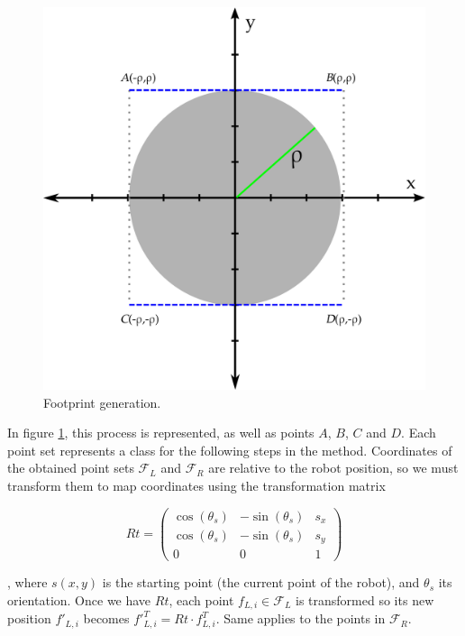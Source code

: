 \begin{figure}[h!]
  \centering
  \includegraphics[width=\textwidth, trim=0 0 0 0,clip]{figure5}
  \caption{Footprint generation.}
  \label{fig:cp06_footprint_generation}
\end{figure}%

In figure \ref{fig:cp06_footprint_generation}, this process is represented, as well as points $A$, $B$, $C$ and $D$. Each point set represents a class for the following steps in the method. Coordinates of the obtained point sets $\mathcal{F}_L$ and $\mathcal{F}_R$ are relative to the robot position, so we must transform them to map coordinates using the transformation matrix

\begin{equation}\label{eq:cp06_Rt_footprint}
 Rt = \left ( \begin{array}{ ccc }
  \cos(\theta_s) & -\sin(\theta_s) & s_x \\
  \cos(\theta_s) & -\sin(\theta_s) & s_y \\
  0 & 0 & 1
 \end{array} \right )
\end{equation}

, where $s(x,y)$ is the starting point (the current point of the robot), and $\theta_s$ its orientation. Once we have $Rt$, each point $f_{L,i} \in \mathcal{F}_L$ is transformed so its new position $f'_{L,i}$ becomes ${f'}_{L,i}^T = Rt \cdot f_{L,i}^T$. Same applies to the points in $\mathcal{F}_R$.

